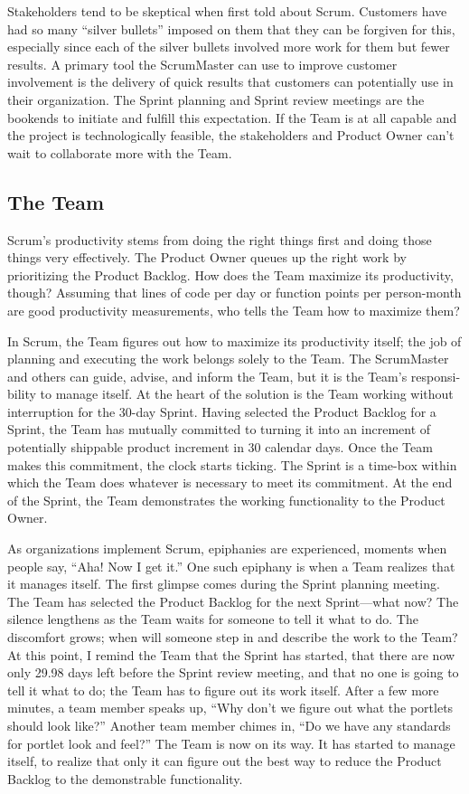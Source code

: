 Stakeholders tend to be skeptical when first told about Scrum. Customers have had so many “silver bullets” imposed on them that they can be forgiven for this, especially since each of the silver bullets involved more work for them but fewer results. A primary tool the ScrumMaster can use to improve customer involvement is the delivery of quick results that customers can potentially use in their organization. The Sprint planning and Sprint review meetings are the bookends to initiate and fulfill this expectation. If the Team is at all capable and the project is technologically feasible, the stakeholders and Product Owner can’t wait to collaborate more with the Team.


\subsection{The Team}

Scrum’s productivity stems from doing the right things first and doing those things very effectively. The Product Owner queues up the right work by prioritizing the Product Backlog. How does the Team maximize its productivity, though? Assuming that lines of code per day or function points per person-month are good productivity measurements, who tells the Team how to maximize them?

In Scrum, the Team figures out how to maximize its productivity itself; the job of planning and executing the work belongs solely to the Team. The ScrumMaster and others can guide, advise, and inform the Team, but it is the Team’s responsi- bility to manage itself. At the heart of the solution is the Team working without interruption for the 30-day Sprint. Having selected the Product Backlog for a Sprint, the Team has mutually committed to turning it into an increment of potentially shippable product increment in 30 calendar days. Once the Team makes this commitment, the clock starts ticking. The Sprint is a time-box within which the Team does whatever is necessary to meet its commitment. At the end of the Sprint, the Team demonstrates the working functionality to the Product Owner.

As organizations implement Scrum, epiphanies are experienced, moments when people say, “Aha! Now I get it.” One such epiphany is when a Team realizes that it manages itself. The first glimpse comes during the Sprint planning meeting. The Team has selected the Product Backlog for the next Sprint—what now? The silence lengthens as the Team waits for someone to tell it what to do. The discomfort grows; when will someone step in and describe the work to the Team? At this point, I remind the Team that the Sprint has started, that there are now only 29.98 days left before the Sprint review meeting, and that no one is going to tell it what to do; the Team has to figure out its work itself. After a few more minutes, a team member speaks up, “Why don’t we figure out what the portlets should look like?” Another team member chimes in, “Do we have any standards for portlet look and feel?” The Team is now on its way. It has started to manage itself, to realize that only it can figure out the best way to reduce the Product Backlog to the demonstrable functionality.

